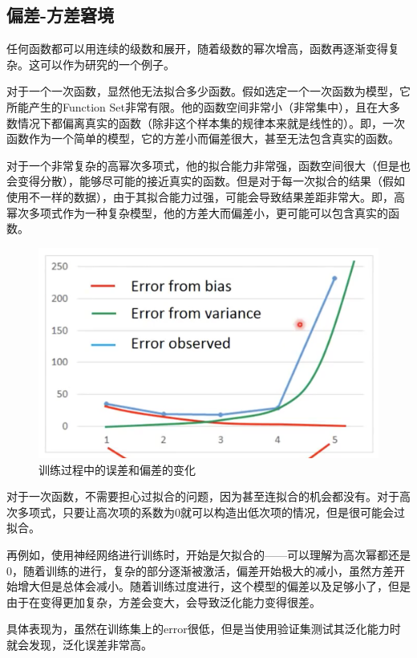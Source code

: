 \documentclass[12pt, letterpaper]{article}
\begin{document}
\subsection{偏差-方差窘境}
任何函数都可以用连续的级数和展开，随着级数的幂次增高，函数再逐渐变得复杂。这可以作为研究的一个例子。

对于一个一次函数，显然他无法拟合多少函数。假如选定一个一次函数为模型，它所能产生的Function Set非常有限。他的函数空间非常小（非常集中），且在大多数情况下都偏离真实的函数（除非这个样本集的规律本来就是线性的）。即，一次函数作为一个简单的模型，它的方差小而偏差很大，甚至无法包含真实的函数。

对于一个非常复杂的高幂次多项式，他的拟合能力非常强，函数空间很大（但是也会变得分散），能够尽可能的接近真实的函数。但是对于每一次拟合的结果（假如使用不一样的数据），由于其拟合能力过强，可能会导致结果差距非常大。即，高幂次多项式作为一种复杂模型，他的方差大而偏差小，更可能可以包含真实的函数。


\begin{figure}
\centering
\includegraphics[scale=0.2]{BV.png}
\caption{训练过程中的误差和偏差的变化}
\end{figure}

对于一次函数，不需要担心过拟合的问题，因为甚至连拟合的机会都没有。对于高次多项式，只要让高次项的系数为0就可以构造出低次项的情况，但是很可能会过拟合。

再例如，使用神经网络进行训练时，开始是欠拟合的——可以理解为高次幂都还是0，随着训练的进行，复杂的部分逐渐被激活，偏差开始极大的减小，虽然方差开始增大但是总体会减小。随着训练过度进行，这个模型的偏差以及足够小了，但是由于在变得更加复杂，方差会变大，会导致泛化能力变得很差。

具体表现为，虽然在训练集上的error很低，但是当使用验证集测试其泛化能力时就会发现，泛化误差非常高。
\end{document}
